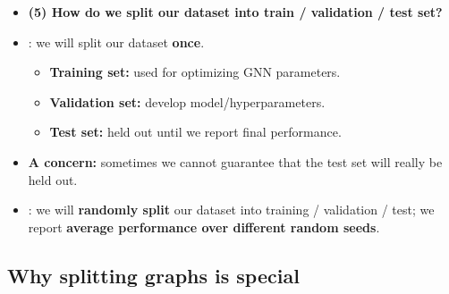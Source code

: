 \begin{itemize}
  \item \textbf{(5) How do we split our dataset into train / validation / test
    set?}
  \item {}: we will split our dataset \textbf{once}.
    \begin{itemize}
      \item \textbf{Training set:} used for optimizing GNN parameters.
      \item \textbf{Validation set:} develop model/hyperparameters.
      \item \textbf{Test set:} held out until we report final performance.
    \end{itemize}
  \item \textbf{A concern:} sometimes we cannot guarantee that the test set
    will really be held out.
  \item {}: we will \textbf{randomly split} our dataset into
    training / validation / test; we report \textbf{average performance over
    different random seeds}.
\end{itemize}

\subsection{Why splitting graphs is special}\label{sec:lec05-special}

